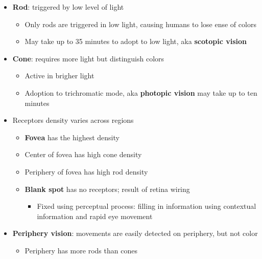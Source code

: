   \begin{itemize}
    \item \textbf{Rod}: triggered by low level of light
    \begin{itemize}
      \item Only rods are triggered in low light, causing humans to lose
      ense of colors
      \item May take up to 35 minutes to adopt to low light, aka
      \textbf{scotopic vision}
    \end{itemize}

    \item \textbf{Cone}: requires more light but distinguish colors
    \begin{itemize}
      \item Active in brigher light
      \item Adoption to trichromatic mode, aka \textbf{photopic vision}
      may take up to ten minutes
    \end{itemize}

    \item Receptors density varies across regions
    \begin{itemize}
      \item \textbf{Fovea} has the highest density
      \item Center of fovea has high cone density
      \item Periphery of fovea has high rod density
      \item \textbf{Blank spot} has no receptors; result of retina wiring
      \begin{itemize}
        \item Fixed using perceptual process: filling in information using
        contextual information and rapid eye movement
      \end{itemize}
    \end{itemize}

    \item \textbf{Periphery vision}: movements are easily detected on
    periphery, but not color
    \begin{itemize}
      \item Periphery has more rods than cones
    \end{itemize}
  \end{itemize}
